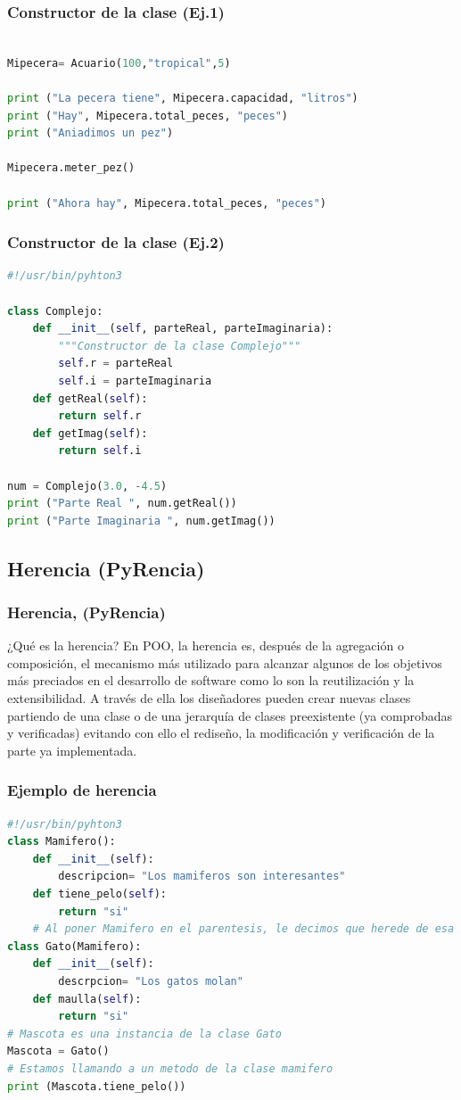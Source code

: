 \documentclass{beamer}
\begin{document}
\begin{frame}[fragile]
\frametitle{Constructor de la clase (Ej.1)}
\begin{lstlisting}[language=Python]

Mipecera= Acuario(100,"tropical",5)

print ("La pecera tiene", Mipecera.capacidad, "litros")
print ("Hay", Mipecera.total_peces, "peces")
print ("Aniadimos un pez")

Mipecera.meter_pez()

print ("Ahora hay", Mipecera.total_peces, "peces")

\end{lstlisting}
\end{frame}
\begin{frame}[fragile]
\frametitle{Constructor de la clase (Ej.2)}
\begin{lstlisting}[language=Python]
#!/usr/bin/pyhton3

class Complejo:
	def __init__(self, parteReal, parteImaginaria):
		"""Constructor de la clase Complejo"""
		self.r = parteReal
		self.i = parteImaginaria
	def getReal(self):
		return self.r
	def getImag(self):
		return self.i

num = Complejo(3.0, -4.5)
print ("Parte Real ", num.getReal())
print ("Parte Imaginaria ", num.getImag())

\end{lstlisting}
\end{frame}

\subsection{Herencia (PyRencia)}

\begin{frame}[fragile]
\frametitle{Herencia, (PyRencia)}
\begin{block}{¿Qué es la herencia?}
En POO, la herencia es, después de la agregación o composición, el mecanismo
más utilizado para alcanzar algunos de los objetivos más preciados en el
desarrollo de software como lo son la reutilización y la extensibilidad. A
través de ella los diseñadores pueden crear nuevas clases partiendo de una
clase o de una jerarquía de clases preexistente (ya comprobadas y
verificadas) evitando con ello el rediseño, la modificación y verificación
de la parte ya implementada.
\end{block}
\end{frame}

\begin{frame}[fragile]
\frametitle{Ejemplo de herencia}
\begin{lstlisting}[language=Python]
#!/usr/bin/pyhton3
class Mamifero():
	def __init__(self):
		descripcion= "Los mamiferos son interesantes"
	def tiene_pelo(self):
		return "si"
	# Al poner Mamifero en el parentesis, le decimos que herede de esa calse
class Gato(Mamifero):
	def __init__(self):
		descrpcion= "Los gatos molan"
	def maulla(self):
		return "si"
# Mascota es una instancia de la clase Gato
Mascota = Gato()
# Estamos llamando a un metodo de la clase mamifero
print (Mascota.tiene_pelo())
\end{lstlisting}

\end{frame}
\end{document}
